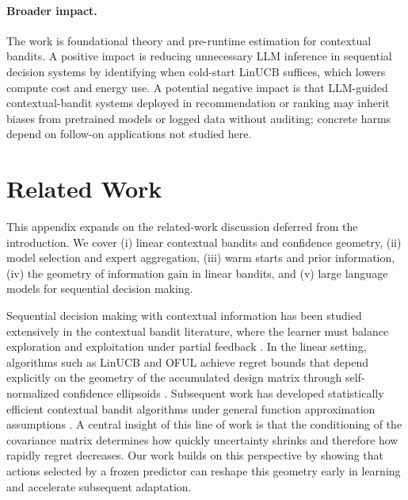 \documentclass{article}
\theoremstyle{definition}
\theoremstyle{remark}
\theoremstyle{remark}
\begin{document}
\paragraph{Broader impact.}
The work is foundational theory and pre-runtime estimation for contextual
bandits. A positive impact is reducing unnecessary LLM inference in
sequential decision systems by identifying when cold-start LinUCB suffices,
which lowers compute cost and energy use. A potential negative impact is that
LLM-guided contextual-bandit systems deployed in recommendation or ranking
may inherit biases from pretrained models or logged data without auditing;
concrete harms depend on follow-on applications not studied here.





\appendix

\section{Related Work}\label{sec:related}
This appendix expands on the related-work discussion deferred from the
introduction. We cover (i) linear contextual bandits and confidence geometry,
(ii) model selection and expert aggregation, (iii) warm starts and prior
information, (iv) the geometry of information gain in linear bandits, and
(v) large language models for sequential decision making.

Sequential decision making with contextual information has been studied
extensively in the contextual bandit literature, where the learner must
balance exploration and exploitation under partial feedback
\cite{langford2007epoch,agarwal2014taming,foster2021statistical,
lattimore2020bandit}. In the linear setting, algorithms such as LinUCB and
OFUL achieve regret bounds that depend explicitly on the geometry of the
accumulated design matrix through self-normalized confidence ellipsoids
\cite{chu2011contextual,abbasi2011improved}. Subsequent work has developed
statistically efficient contextual bandit algorithms under general function
approximation assumptions \cite{agarwal2012contextual,foster2018practical,
foster2020beyond,simchi2022bypassing,zhu2022contextual,rucker2023infinite,
zhang2024efficient}. A central insight of this line of work is that the
conditioning of the covariance matrix determines how quickly uncertainty
shrinks and therefore how rapidly regret decreases. Our work builds on this
perspective by showing that actions selected by a frozen predictor can
reshape this geometry early in learning and accelerate subsequent adaptation.
\end{document}
